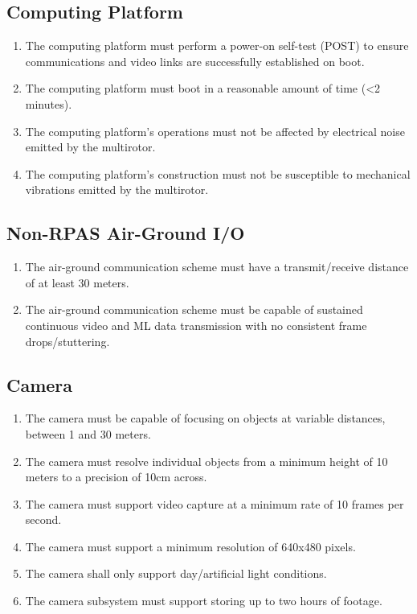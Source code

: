 \documentclass[10pt,letterpaper]{article}
\begin{document}
\subsection{Computing Platform}
\begin{enumerate}[label=NF.CP.\arabic*, wide=1cm, widest=3cm, leftmargin=*, font=\bfseries, noitemsep,topsep=0pt, parsep=4pt, partopsep=0pt]
	\item The computing platform must perform a power-on self-test (POST) to ensure communications and video links are successfully established on boot.
	\item The computing platform must boot in a reasonable amount of time (<2 minutes).
	\item The computing platform's operations must not be affected by electrical noise emitted by the multirotor.	
	\item The computing platform's construction must not be susceptible to mechanical vibrations emitted by the multirotor.	
\end{enumerate}

\subsection{Non-RPAS Air-Ground I/O}
\begin{enumerate}[label=NF.CM.\arabic*, wide=1cm, widest=3cm, leftmargin=*, font=\bfseries, noitemsep,topsep=0pt, parsep=4pt, partopsep=0pt]
	\item The air-ground communication scheme must have a transmit/receive distance of at least 30 meters.
	\item The air-ground communication scheme must be capable of sustained continuous video and ML data transmission with no consistent frame drops/stuttering.
\end{enumerate}

\subsection{Camera}
\begin{enumerate}[label=NF.CAM.\arabic*, wide=1cm, widest=3cm, leftmargin=*, font=\bfseries, noitemsep,topsep=0pt, parsep=4pt, partopsep=0pt]
	\item The camera must be capable of focusing on objects at variable distances, between 1 and 30 meters.
	\item The camera must resolve individual objects from a minimum height of 10 meters to a precision of 10cm across.
	\item The camera must support video capture at a minimum rate of 10 frames per second.
	\item The camera must support a minimum resolution of 640x480 pixels.
	\item The camera shall only support day/artificial light conditions.
	\item The camera subsystem must support storing up to two hours of footage.
\end{enumerate}
\end{document}

